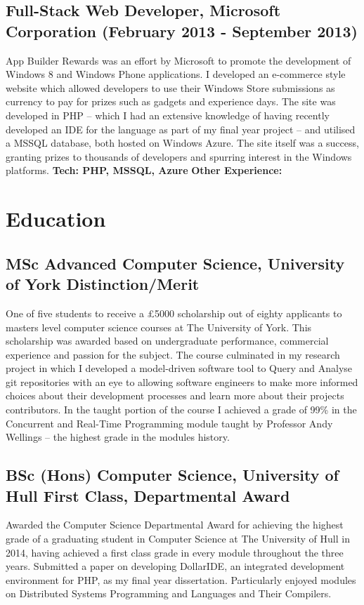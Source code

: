 \documentclass[10pt,letterpaper]{article}
\begin{document}
	\subsection*{Full-Stack Web Developer, Microsoft Corporation \small{(February 2013 - September 2013)}}
	App Builder Rewards was an effort by Microsoft to promote the development of Windows 8 and Windows Phone applications. I developed an e-commerce style website which allowed developers to use their Windows Store submissions as currency to pay for prizes such as gadgets and experience days. The site was developed in PHP -- which I had an extensive knowledge of having recently developed an IDE for the language as part of my final year project -- and utilised a MSSQL database, both hosted on Windows Azure. The site itself was a success, granting prizes to thousands of developers and spurring interest in the Windows platforms.
	\textbf{Tech: PHP, MSSQL, Azure}
	\newline \newline
	\bfseries{ Other Experience: } 
	
	\section*{Education}
	\subsection*{MSc Advanced Computer Science, University of York \small{Distinction/Merit}}
	One of five students to receive a \pounds5000 scholarship out of eighty applicants to masters level computer science courses at The University of York. This scholarship was awarded based on undergraduate performance, commercial experience and passion for the subject. The course culminated in my research project in which I developed a model-driven software tool to Query and Analyse git repositories with an eye to allowing software engineers to make more informed choices about their development processes and learn more about their projects contributors. In the taught portion of the course I achieved a grade of 99\% in the Concurrent and Real-Time Programming module taught by Professor Andy Wellings -- the highest grade in the modules history.

	\subsection*{BSc (Hons) Computer Science, University of Hull \small{First Class, Departmental Award}}
	Awarded the Computer Science Departmental Award for achieving the highest grade of a graduating student in Computer Science at The University of Hull in 2014, having achieved a first class grade in every module throughout the three years. Submitted a paper on developing DollarIDE, an integrated development environment for PHP, as my final year dissertation. Particularly enjoyed modules on Distributed Systems Programming and Languages and Their Compilers.
\end{document}
